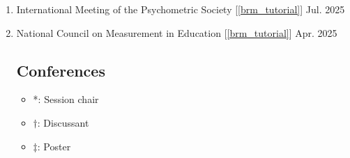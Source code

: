 \documentclass[11pt]{article}
\begin{document}
\begin{enumerate}
\subsection{Workshops}

\item International Meeting of the Psychometric Society [\ref{brm_tutorial}] \hfill Jul. 2025 
\item National Council on Measurement in Education [\ref{brm_tutorial}] \hfill Apr. 2025 

\subsection{Conferences}

\begin{itemize}
\item[]*: Session chair
\item[] $\dagger$: Discussant
\item[]$\ddagger$: Poster
\end{itemize}


\end{enumerate}
\end{document}
